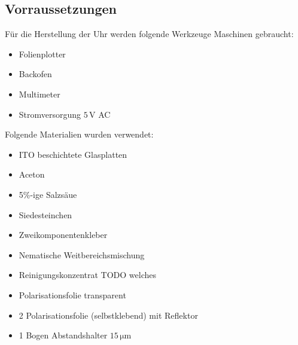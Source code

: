 \subsection{Vorraussetzungen}
Für die Herstellung der Uhr werden folgende Werkzeuge Maschinen gebraucht:
\begin{itemize}
\item Folienplotter
\item Backofen
\item Multimeter
\item Stromversorgung \(5\,\mathrm{V}\) AC

\end{itemize}
Folgende Materialien wurden verwendet:
\begin{itemize}
\item ITO beschichtete Glasplatten
\item Aceton
\item 5\%-ige Salzsäue
\item Siedesteinchen
\item Zweikomponentenkleber
\item Nematische Weitbereichsmischung
\item Reinigungskonzentrat TODO welches
\item Polarisationsfolie transparent
\item 2 Polarisationsfolie (selbstklebend) mit Reflektor
\item 1 Bogen Abstandshalter \(15\,\mathrm{\mu m}\)
\end{itemize}